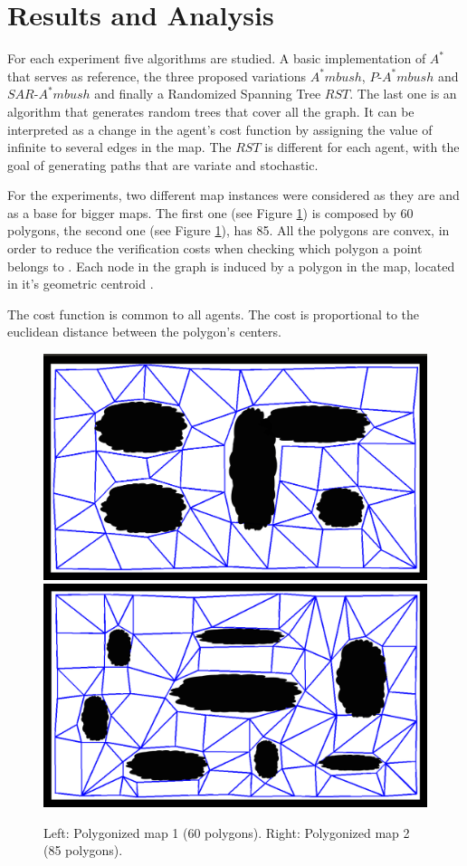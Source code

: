 \section{Results and Analysis}
For each experiment five algorithms are studied.
A basic implementation of $A^*$ that serves as reference,
the three proposed variations $A^*mbush$, $P$-$A^*mbush$
and $SAR$-$A^*mbush$ and finally a Randomized Spanning Tree $RST$.
The last one is an algorithm that generates random trees that
cover all the  graph. It can be interpreted as a change in
the agent's cost function by assigning the value of infinite
to several edges in the map. The  $RST$ is different for
each agent, with the goal of generating paths that are
variate and stochastic.

For the experiments, two different map instances were 
considered as they are and as a base for bigger maps. 
The first one (see Figure \ref{fig:gs}) is composed
by 60 polygons, the second one (see Figure \ref{fig:gs}), has 85.
All the polygons are convex, in order to reduce the verification costs
when checking which polygon a point belongs to \cite{web1}. 
Each node in the graph is induced by a polygon in the map, 
located in it's geometric centroid \cite{book3}.

The cost function is common to all agents. The cost is proportional
to the euclidean distance between the polygon's centers. 

\begin{figure}[htb]
	\centerline{
		\includegraphics[width=0.48\columnwidth]{figures/g2.png}
		\includegraphics[width=0.48\columnwidth]{figures/g1.png}
	}
	\caption{\label{fig:gs}
	     Left: Polygonized map 1 (60 polygons).
	     Right: Polygonized map 2 (85 polygons).}
\end{figure}

